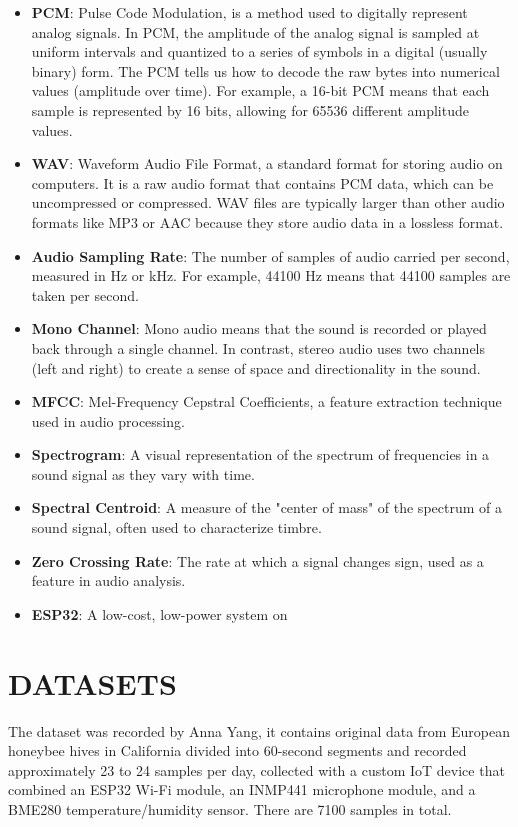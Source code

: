 \documentclass[12pt]{report}
\begin{document}
\begin{itemize}
	\item \textbf{PCM}: Pulse Code Modulation, is a method used to digitally represent analog signals. In PCM, the amplitude of the analog signal is sampled at uniform intervals and quantized to a series of symbols in a digital (usually binary) form. The PCM tells us how to decode the raw bytes into numerical values (amplitude over time). For example, a 16-bit PCM means that each sample is represented by 16 bits, allowing for 65536 different amplitude values.
	\item \textbf{WAV}: Waveform Audio File Format, a standard format for storing audio on computers. It is a raw audio format that contains PCM data, which can be uncompressed or compressed. WAV files are typically larger than other audio formats like MP3 or AAC because they store audio data in a lossless format.
	\item \textbf{Audio Sampling Rate}: The number of samples of audio carried per second, measured in Hz or kHz. For example, 44100 Hz means that 44100 samples are taken per second.
	\item \textbf{Mono Channel}: Mono audio means that the sound is recorded or played back through a single channel. In contrast, stereo audio uses two channels (left and right) to create a sense of space and directionality in the sound.
	\item \textbf{MFCC}: Mel-Frequency Cepstral Coefficients, a feature extraction technique used in audio processing.
	\item \textbf{Spectrogram}: A visual representation of the spectrum of frequencies in a sound signal as they vary with time.
	\item \textbf{Spectral Centroid}: A measure of the "center of mass" of the spectrum of a sound signal, often used to characterize timbre.
	\item \textbf{Zero Crossing Rate}: The rate at which a signal changes sign, used as a feature in audio analysis.
	\item \textbf{ESP32}: A low-cost, low-power system on
\end{itemize}

\section{DATASETS}

\par The dataset\cite{AnnaYang-Dataset} was recorded by Anna Yang, it contains original data from European honeybee hives in California divided into 60-second segments and recorded approximately 23 to 24 samples per day, collected with a custom IoT device that combined an ESP32 Wi-Fi module, an INMP441 microphone module, and a BME280 temperature/humidity sensor. There are 7100 samples in total.
\end{document}
